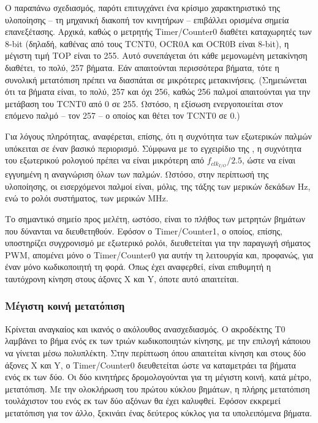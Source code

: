 %
%

Ο παραπάνω σχεδιασμός, παρότι επιτυγχάνει ένα κρίσιμο χαρακτηριστικό της
υλοποίησης -- τη μηχανική διακοπή τον κινητήρων -- επιβάλλει ορισμένα σημεία
επανεξέτασης. Αρχικά, καθώς ο μετρητής \textenglish{Timer\slash Counter0}
διαθέτει καταχωρητές των 8-bit (δηλαδή, καθένας από τους TCNT0, OCR0A και
OCR0B είναι 8-bit), η μέγιστη τιμή TOP είναι το 255. Αυτό συνεπάγεται ότι
κάθε μεμονωμένη μετακίνηση διαθέτει, το πολύ, 257 βήματα. Εάν απαιτούνται
περισσότερα βήματα, τότε η συνολική μετατόπιση πρέπει να διασπάται σε
μικρότερες μετακινήσεις. (Σημειώνεται ότι τα βήματα είναι, το πολύ, 257 και όχι
256, καθώς 256 παλμοί απαιτούνται για την μετάβαση του TCNT0 από 0 σε 255.
Ωστόσο, η εξίσωση ενεργοποιείται στον επόμενο παλμό -- τον 257 -- ο οποίος και
θέτει τον TCNT0 σε 0.)

Για λόγους πληρότητας, αναφέρεται, επίσης, ότι η συχνότητα των εξωτερικών παλμών
υπόκειται σε έναν βασικό περιορισμό. Σύμφωνα με το εγχειρίδιο της
\textcite[139--140]{atmel13}, η συχνότητα του εξωτερικού ρολογιού πρέπει να
είναι μικρότερη από $f_{clk_{I/O}}/2.5$, ώστε να είναι εγγυημένη η αναγνώριση
όλων των παλμών. Ωστόσο, στην περίπτωσή της υλοποίησης, οι εισερχόμενοι παλμοί
είναι, μόλις, της τάξης των μερικών δεκάδων Hz, ενώ το ρολόι συστήματος, των
μερικών MHz.

Το σημαντικό σημείο προς μελέτη, ωστόσο, είναι το πλήθος των μετρητών βημάτων
που δύνανται να διευθετηθούν. Εφόσον ο \textenglish{Timer\slash Counter1}, ο
οποίος, επίσης, υποστηρίζει συγχρονισμό με εξωτερικό ρολόι, διευθετείται για την
παραγωγή σήματος PWM, απομένει μόνο ο \textenglish{Timer\slash Counter0} για
αυτήν τη λειτουργία και, προφανώς, για έναν μόνο κωδικοποιητή τη φορά. Όπως έχει
αναφερθεί, είναι επιθυμητή η ταυτόχρονη κίνηση στους άξονες X και Y, όποτε αυτό
απαιτείται.


\subsubsection{Μέγιστη κοινή μετατόπιση}

Κρίνεται αναγκαίος και ικανός ο ακόλουθος ανασχεδιασμός. Ο ακροδέκτης T0
λαμβάνει το βήμα ενός εκ των τριών κωδικοποιητών κίνησης, με την επιλογή κάποιου
να γίνεται μέσω πολυπλέκτη. Στην περίπτωση όπου απαιτείται κίνηση και στους δύο
άξονες X και Y, ο \textenglish{Timer\slash Counter0} διευθετείται ώστε να
καταμετράει τα βήματα ενός εκ των δύο. Οι δύο κινητήρες δρομολογούνται για τη
μέγιστη κοινή, κατά μέτρο, μετατόπιση. Με την ολοκλήρωση του πρώτου κύκλου
βημάτων, η πλήρης μετατόπιση τουλάχιστον του ενός εκ των δύο αξόνων θα έχει
καλυφθεί. Εφόσον εκκρεμεί μετατόπιση για τον άλλο, ξεκινάει ένας δεύτερος κύκλος
για τα υπολειπόμενα βήματα.

